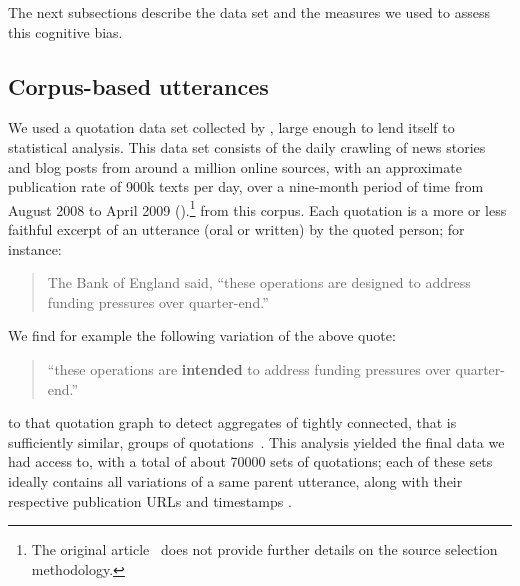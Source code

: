 The next subsections describe the data set and the measures we used to assess this cognitive bias.

\subsection{Corpus-based utterances}

We used a quotation data set collected by \citet{leskovec_meme-tracking_2009}, large enough to lend itself to statistical analysis.
This data set consists of the daily crawling of news stories and blog posts from around a million online sources, with an approximate publication rate of 900k texts per day, over a nine-month period of time from August 2008 to April 2009 (\citealp{leskovec_meme-tracking_2009}).\footnote{
The original article~\citep{leskovec_meme-tracking_2009} does not provide further details on the source selection methodology.
}
 from this corpus.
Each quotation is a more or less faithful excerpt of an utterance (oral or written) by the quoted person; for instance:
\begin{quote}
The Bank of England said, ``these operations are designed to address funding pressures over quarter-end.''
\end{quote}

We find for example the following variation of the above quote:
\begin{quote}
``these operations are \textbf{intended} to address funding pressures over quarter-end.''
\end{quote}
 to that quotation graph to detect aggregates of tightly connected, that is sufficiently similar, groups of quotations~\citep[see again][for more details]{leskovec_meme-tracking_2009}.
This analysis yielded the final data we had access to, with a total of about \num{70000} sets of quotations; each of these sets ideally contains all variations of a same parent utterance, along with their respective publication URLs and timestamps .

